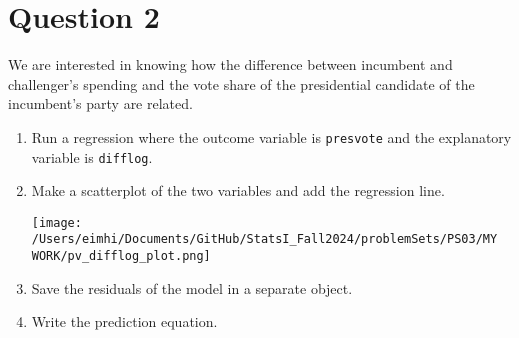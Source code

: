 \documentclass[12pt,letterpaper]{article}
\begin{document}
\newpage

\section*{Question 2}
\noindent We are interested in knowing how the difference between incumbent and challenger's spending and the vote share of the presidential candidate of the incumbent's party are related.	\vspace{.25cm}
	\begin{enumerate}
		\item Run a regression where the outcome variable is \texttt{presvote} and the explanatory variable is \texttt{difflog}.	\vspace{1cm}
		
		  
		
		\vspace{1cm}
		
		\item Make a scatterplot of the two variables and add the regression line. 	
		\vspace{1cm}
		
		  
	
		\vspace{1cm}
		
		\texttt{[image: /Users/eimhi/Documents/GitHub/StatsI\_Fall2024/problemSets/PS03/MY WORK/pv\_difflog\_plot.png]}
		
		\vspace{1cm}
		
		\item Save the residuals of the model in a separate object.	
			\vspace{1cm}
		
		  
		
		\vspace{1cm}
		
		\item Write the prediction equation.
			\vspace{1cm}
		
		  
		
		\vspace{1cm}
	\end{enumerate}
	
\end{document}
